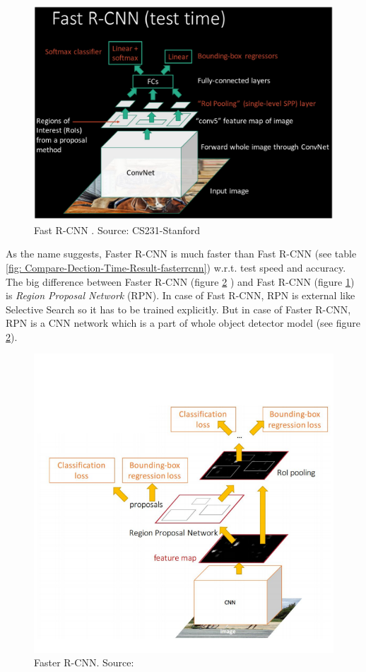 \documentclass[twoside]{iitbreport}
\begin{document}
\begin{figure}[H]
\includegraphics[width=0.85\linewidth]{Fast-RCNN.png}
\centering
\captionsetup{justification=centering}
\caption{Fast R-CNN \cite{girshick2015fast} . Source: CS231-Stanford\protect\footnotemark}
\label{fig: Fast R-CNN}
\end{figure}

As the name suggests, Faster R-CNN is much faster than Fast R-CNN (see table \ref{fig: Compare-Dection-Time-Result-fasterrcnn}) w.r.t. test speed and accuracy. The big difference between Faster R-CNN (figure \ref{fig: Faster R-CNN} ) and Fast R-CNN (figure \ref{fig: Fast R-CNN})  is \textit{Region Proposal Network} (RPN). In case of  Fast R-CNN, RPN is external like Selective Search so it has to be trained explicitly. But in case of Faster R-CNN, RPN is a CNN network which is a part of whole object detector model (see figure \ref{fig: Faster R-CNN}).   

\begin{figure}[H]
\includegraphics[width=0.85\linewidth]{Faster-RCNN.png}
\centering
\captionsetup{justification=centering}
\caption{Faster R-CNN. Source: \cite{ren2015faster}}
\label{fig: Faster R-CNN}
\end{figure}
\end{document}
